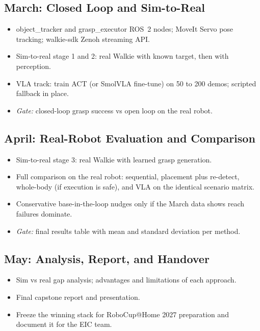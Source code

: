 \documentclass[12pt,a4paper]{article}
\begin{document}
\subsection*{March: Closed Loop and Sim-to-Real}
\begin{itemize}
  \item object\_tracker and grasp\_executor ROS~2 nodes; MoveIt Servo pose tracking; walkie-sdk
        Zenoh streaming API.
  \item Sim-to-real stage 1 and 2: real Walkie with known target, then with perception.
  \item VLA track: train ACT (or SmolVLA fine-tune) on 50 to 200 demos; scripted fallback in
        place.
  \item \textit{Gate:} closed-loop grasp success vs open loop on the real robot.
\end{itemize}

\subsection*{April: Real-Robot Evaluation and Comparison}
\begin{itemize}
  \item Sim-to-real stage 3: real Walkie with learned grasp generation.
  \item Full comparison on the real robot: sequential, placement plus re-detect, whole-body (if
        execution is safe), and VLA on the identical scenario matrix.
  \item Conservative base-in-the-loop nudges only if the March data shows reach failures
        dominate.
  \item \textit{Gate:} final results table with mean and standard deviation per method.
\end{itemize}

\subsection*{May: Analysis, Report, and Handover}
\begin{itemize}
  \item Sim vs real gap analysis; advantages and limitations of each approach.
  \item Final capstone report and presentation.
  \item Freeze the winning stack for RoboCup@Home 2027 preparation and document it for the
        EIC team.
\end{itemize}
\end{document}
